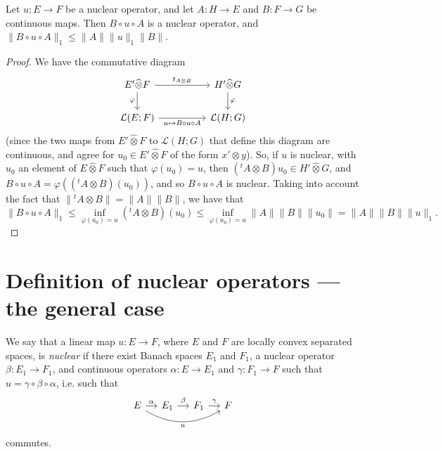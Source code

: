 \documentclass{article}
\theoremstyle{plain}
\newenvironment{proposition}[1]
    {\renewcommand\theinnercustomproposition{#1}\innercustomproposition}
    {\endinnercustomproposition}
\theoremstyle{definition}
\newenvironment{definition}[1]
    {\renewcommand\theinnercustomdefinition{#1}\innercustomdefinition}
    {\endinnercustomdefinition}
\newcommand{\LL}{\mathcal{L}}
\newcommand{\cotimes}{\widehat{\otimes}}
\newcommand{\transpose}[1]{{}^t\!{#1}}
\renewcommand{\leq}{\leqslant}
\newcommand{\oldpage}[1]{\marginpar{\footnotesize$\Big\vert$ \textit{p.~#1}}}
\begin{document}
\begin{proposition}{2}
\label{proposition2}
  Let $u\colon E\to F$ be a nuclear operator, and let $A\colon H\to E$ and $B\colon F\to G$ be continuous maps.
  Then $B\circ u\circ A$ is a nuclear operator, and $\|B\circ u\circ A\|_1 \leq \|A\|\|u\|_1\|B\|$.
\end{proposition}

\begin{proof}
  We have the commutative diagram
  \[
    \begin{tikzcd}[column sep=huge]
      E'\cotimes F \ar[r,"t_{A\otimes B}"] \ar[d,swap,"\varphi"]
      & H'\cotimes G \ar[d,"\varphi"]
    \\\LL(E;F) \ar[r,swap,"u\mapsto B\circ u\circ A"]
      & \LL(H;G)
    \end{tikzcd}
  \]
  (since the two maps from $E'\cotimes F$ to $\LL(H;G)$ that define this diagram are continuous, and agree for $u_0\in E'\cotimes F$ of the form $x'\otimes y$).
  So, if $u$ is nuclear, with $u_0$ an element of $E\cotimes F$ such that $\varphi(u_0)=u$, then $(\transpose{A}\otimes B)u_0\in H'\cotimes G$, and $B\circ u\circ A=\varphi((\transpose{A}\otimes B)(u_0))$, and so $B\circ u\circ A$ is nuclear.
  Taking into account the fact that $\|\transpose{A}\otimes B\|=\|A\|\|B\|$,
\oldpage{4}
  we have that
  \[
    \|B\circ u\circ A\|_1
    \leq \inf_{\varphi(u_0)=u}(\transpose{A}\otimes B)(u_0)
    \leq \inf_{\varphi(u_0)=u}\|A\|\|B\|\|u_0\|
    = \|A\|\|B\|\|u\|_1.
  \]
\end{proof}


\section{Definition of nuclear operators — the general case}
\label{section4}

\begin{definition}{2}
\label{definition2}
  We say that a linear map $u\colon E\to F$, where $E$ and $F$ are locally convex separated spaces, is \emph{nuclear} if there exist Banach spaces $E_1$ and $F_1$, a nuclear operator $\beta\colon E_1\to F_1$, and continuous operators $\alpha\colon E\to E_1$ and $\gamma\colon F_1\to F$ such that $u=\gamma\circ\beta\circ\alpha$, i.e. such that
  \[
    \begin{tikzcd}[column sep=small]
      E \ar[r,"\alpha"] \ar[rrr,bend right,swap,"u"]
      & E_1 \ar[r,"\beta"]
      & F_1 \ar[r,"\gamma"]
      & F
    \end{tikzcd}
  \]
  commutes.
\end{definition}
\end{document}
